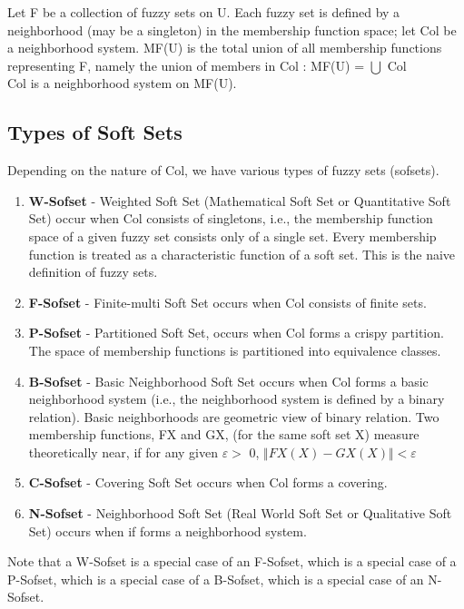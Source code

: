 \documentclass[12pt]{article} %
\begin{document}
Let F be a collection of fuzzy sets on U. Each fuzzy set is defined by a neighborhood (may be a singleton) in the membership function space; let Col be a neighborhood system. MF(U) is the total union of all membership functions representing F, namely the union of members in Col :
MF(U) = \begin{math} \bigcup \end{math} Col \\
Col is a neighborhood system on MF(U).


\subsection{Types of Soft Sets}
Depending on the nature of Col, we have various types of fuzzy sets (sofsets).
\begin{enumerate}
\item{\textbf{W-Sofset} - Weighted Soft Set (Mathematical Soft
Set or Quantitative Soft Set) occur when Col consists of singletons, i.e., the membership function space of a given fuzzy set consists only of a single set. Every membership function is treated as a characteristic function of a soft set. This is the naive definition of fuzzy sets.}
\item{\textbf{F-Sofset} - Finite-multi Soft Set occurs when Col consists of
finite sets.}
\item{\textbf{P-Sofset} - Partitioned Soft Set, occurs when Col forms a crispy
partition. The space of membership functions is partitioned into
equivalence classes.}
\item{\textbf{B-Sofset} - Basic Neighborhood Soft Set occurs when Col
forms a basic neighborhood system (i.e., the
neighborhood system is defined by a binary relation). Basic neighborhoods are geometric view of binary relation. Two membership functions, FX and GX, (for the same soft set X) measure theoretically near, if for any given $\varepsilon >$ 0,
$\Vert FX(X) - GX(X) \Vert < \varepsilon$
}

\item{\textbf{C-Sofset} - Covering Soft Set occurs when Col forms a
covering.}

\item{\textbf{N-Sofset} - Neighborhood Soft Set (Real World Soft
Set or Qualitative Soft Set) occurs when if forms a
neighborhood system.}

\end{enumerate}

Note that a W-Sofset is a special case of an F-Sofset, which is a special case of a P-Sofset, which is a special case of a B-Sofset, which is a special case of an N-Sofset.
\end{document}
